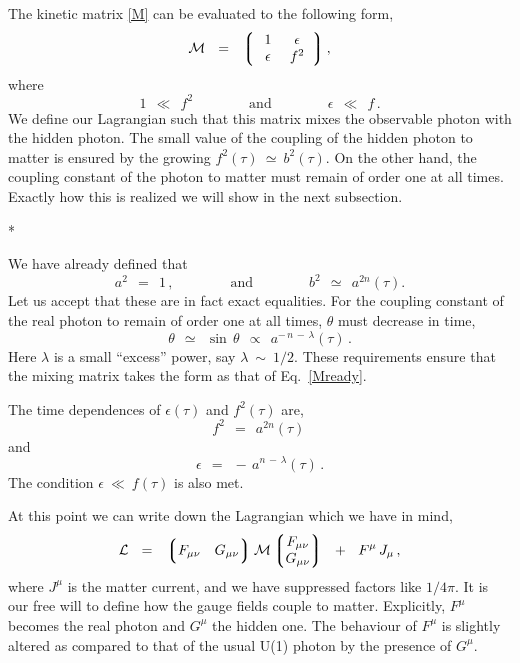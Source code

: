 \documentclass[12pt]{article}
\def\beq{\begin{equation}}
\def\eeq{\end{equation}}
\newcommand{\mc}[1]{\mathcal{#1}}
\newcommand{\lgr}{\left\lgroup}
\newcommand{\rgr}{\right\rgroup}
\begin{document}
	The kinetic matrix \eqref{M} can be evaluated to the following form,
\beq
\label{Mready}
	\mc{M}  ~~=~~  
			\lgr\;\;\, \begin{matrix}
				    1           \,&\,    \epsilon    \\
				    \epsilon    \,&\,    f^2
			     \end{matrix} \;\;\rgr,
\eeq
	where
\[
	1  ~~\ll~~  f^2
	\qquad\qquad
	\text{and}
	\qquad\qquad
	\epsilon  ~~\ll~~  f\,.
\]
	We define our Lagrangian such that this matrix mixes the observable photon with the hidden photon.
	The small value of the coupling of the hidden photon to matter is ensured by the growing 
$ f^2(\tau) ~\simeq~ b^2(\tau) $.
	On the other hand, the coupling constant of the photon to matter must remain 
	of order one at all times. 
	Exactly how this is realized we will show in the next subsection.

\pagebreak

\vspace{1.0cm}
\centerline{*\qquad\qquad\qquad*\qquad\qquad\qquad*}
\vspace{1.0cm}

	We have already defined that 
\[
	a^2    ~~=~~    1\,,
	\qquad\qquad
	\text{and}
	\qquad\qquad
	b^2    ~~\simeq~~    a^{2n}(\tau).
\]
	Let us accept that these are in fact exact equalities.
	For the coupling constant of the real photon to remain of order one at all times, 
	$ \theta $ must decrease in time,
\[
	\theta    ~~\simeq~~    \sin\,\theta    ~~\propto~~    a^{-\, n \,-\, \lambda}(\tau) \,.
\]
	Here $ \lambda $ is a small ``excess'' power, say $ \lambda  ~\sim~ 1/2 $.
	These requirements ensure that the mixing matrix takes the form as that of Eq.~\eqref{Mready}.

	The time dependences of $ \epsilon(\tau) $ and $ f^2(\tau) $ are,
\[
	f^2    ~~=~~    a^{2n}(\tau)\,
\]
	and
\[
	\epsilon    ~~=~~    -\, a^{n \,-\, \lambda}(\tau)\,.
\]
	The condition $ \epsilon ~\ll~ f(\tau) $ is also met.

	At this point we can write down the Lagrangian which we have in mind,
\[
	\mc{L}    ~~=~~    \lgr F_{\mu\nu}  \quad G_{\mu\nu} \rgr  \mc{M}  
			\lgr \begin{matrix}
			     		F_{\mu\nu}  \\
					G_{\mu\nu}
			     \end{matrix} \rgr
			~~+~~
			F^\mu\, J_\mu\,,
\]
	where $ J^\mu $ is the matter current, and we have suppressed factors like $ 1/4\pi $.
	It is our free will to define how the gauge fields couple to matter.
	Explicitly, $ F^\mu $ becomes the real photon and $ G^\mu $ the hidden one. 
	The behaviour of $ F^\mu $ is slightly altered as compared to that of the usual U(1) photon by the presence of $ G^\mu $.
\end{document}
